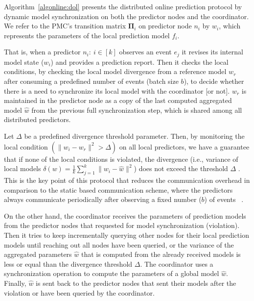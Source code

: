 \par Algorithm~\ref{algonline:dol} presents the distributed online prediction protocol by dynamic model synchronization on both the predictor nodes and the coordinator. We refer to the PMC's transition matrix $\boldsymbol{\Pi}_i$ on predictor node $n_i$ by $w_i$, which represents the parameters of the local prediction model $f_i$. 

\par That is, when a predictor $n_i:\ i \in[k]$ observes an event $e_j$ it revises its internal model state ($w_i$) and provides a prediction report. Then it checks the local conditions, by checking the local model divergence from a reference model $w_r$ after consuming a predefined number of events (batch size $b$), to decide whether there is a need to synchronize its local model with the coordinator [or not]. $w_r$ is maintained in the predictor node as a copy of the last computed aggregated model $\hat{w}$ from the previous full synchronization step, which is shared among all distributed predictors.
 \par Let $\Delta$ be a predefined divergence threshold parameter. Then, by monitoring the local condition $(\|w_i - w_r\|^2 > \Delta)$ on all local predictors, we have a guarantee that if none of the local conditions is violated, the divergence (i.e., variance of local models $\delta(w)=\frac{1}{k} \sum_{j=1}^{k}\|w_i - \hat{w}\|^2$) does not exceed the threshold $\Delta$ \cite{kamp2014communication}. This is the key point of this protocol that reduces the communication overhead in comparison to the static based communication scheme, where the predictors always communicate periodically after observing a fixed number ($b$) of events ~\cite{dekel2012optimal}.  

\par On the other hand, the coordinator receives the parameters of prediction models from the predictor nodes that requested for model synchronization (violation). Then it tries to keep incrementally querying other nodes for their local prediction models until reaching out all nodes have been queried, or the variance of the aggregated parameters $\hat{w}$ that is computed from the already received models is less or equal than the divergence threshold $\Delta$. The coordinator uses a synchronization operation to compute the parameters of a global model  $\hat{w}$. Finally, $\hat{w}$ is sent back to the predictor nodes that sent their models after the violation or have been queried by the coordinator. 

